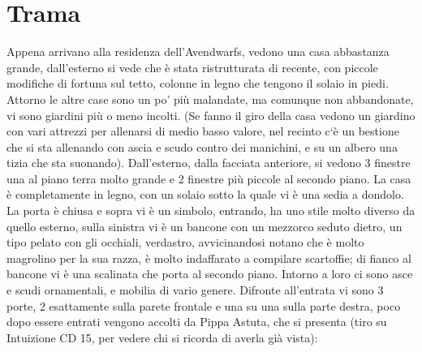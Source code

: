 \documentclass{article}
\begin{document}
\section{Trama}
    Appena arrivano alla residenza dell’Avendwarfs, vedono una casa abbastanza grande, dall’esterno si vede che è stata ristrutturata di recente, con piccole modifiche di fortuna sul tetto, colonne in legno che tengono il solaio in piedi. Attorno le altre case sono un po’ più malandate, ma comunque non abbandonate, vi sono giardini più o meno incolti. (Se fanno il giro della casa vedono un giardino con vari attrezzi per allenarsi di medio basso valore, nel recinto c`è un bestione che si sta allenando con ascia e scudo contro dei manichini, e su un albero una tizia che sta suonando). Dall’esterno, dalla facciata anteriore, si vedono 3 finestre una al piano terra molto grande e 2 finestre più piccole al secondo piano. La casa è completamente in legno, con un solaio sotto la quale vi è una sedia a dondolo. La porta è chiusa e sopra vi è un simbolo, entrando, ha uno stile molto diverso da quello esterno, sulla sinistra vi è un bancone con un mezzorco seduto dietro, un tipo pelato con gli occhiali, verdastro, avvicinandosi notano che è molto magrolino per la sua razza, è molto indaffarato a compilare scartoffie; di fianco al bancone vi è una scalinata che porta al secondo piano. Intorno a loro ci sono asce e scudi ornamentali, e mobilia di vario genere. Difronte all’entrata vi sono 3 porte, 2 esattamente sulla parete frontale e una su una sulla parte destra, poco dopo essere entrati vengono accolti da Pippa Astuta, che si presenta (tiro su Intuizione CD  15, per vedere chi si ricorda di averla già vista):
\end{document}

